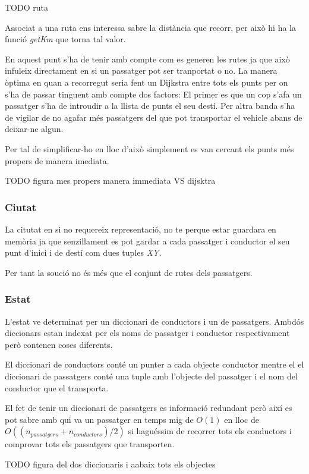 TODO ruta


Associat a una ruta ens interessa sabre la distància que recorr, per això hi ha la funció \emph{getKm}
que torna tal valor.


En aquest punt s'ha de tenir amb compte com es generen les rutes ja que això infuleix directament en
si un passatger pot ser tranportat o no. La manera òptima en quan a recorregut seria fent un Dijkstra
entre tots els punts per on s'ha de passar tinguent amb compte dos factors:
El primer es que un cop s'afa un passatger s'ha de introudir a la llista de punts el seu destí.
Per altra banda s'ha de vigilar de no agafar més passatgers del que pot transportar el vehicle
abans de deixar-ne algun.

Per tal de simplificar-ho en lloc d'això simplement es van cercant els punts més propers de
manera imediata.

TODO figura mes propers manera immediata VS dijsktra


\subsubsection{Ciutat}
La citutat en si no requereix representació, no te perque estar guardara en memòria ja que senzillament
es pot gardar a cada passatger i conductor el seu punt d'inici i de destí com dues tuples \emph{XY}.

Per tant la so\lgem ució no és més que el conjunt de rutes dels passatgers.

\subsubsection{Estat}
L'estat ve determinat per un diccionari de conductors i un de passatgers. Ambdós diccionars estan
indexat per els noms de passatger i conductor respectivament però contenen coses diferents.

El diccionari de conductors conté un punter a cada objecte conductor mentre el el diccionari
de passatgers conté una tuple amb l'objecte del passatger i el nom del conductor que el transporta.

El fet de tenir un diccionari de passatgers es informació redundant però així es pot sabre
amb qui va un passatger en temps mig de  $O(1)$ en lloc de $O((n_{passatgers} + n_{conductors})/2)$ 
si haguéssim de recorrer tots els conductors i comprovar tots els passatgers que transporten.


TODO figura del dos diccionaris i aabaix tots els objectes

